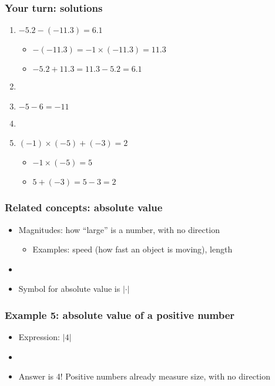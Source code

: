\documentclass[12pt]{beamer}
\newcommand{\myframe}[1]{\begin{frame} \frametitle{#1}}
\begin{document}
\myframe{Your turn: solutions}
\begin{enumerate}
\item $-5.2 - (-11.3) = 6.1$
\begin{itemize}
\item $-(-11.3) = -1 \times (-11.3) = 11.3$
\item $-5.2 + 11.3 = 11.3 - 5.2 = 6.1$
\end{itemize}
\item[]
\item $-5 - 6 = -11$
\item[]
\item $(-1)\times(-5) + (-3) = 2$
\begin{itemize}
\item $-1 \times (-5) = 5$
\item $5 + (-3) = 5 - 3 = 2$
\end{itemize}
\end{enumerate}
\end{frame}

\myframe{Related concepts: absolute value}
\begin{itemize}
\item Magnitudes: how ``large'' is a number, with no direction
\begin{itemize}
\item Examples: speed (how fast an object is moving), length 
\end{itemize}
\item[]
\item Symbol for absolute value is $|\cdot |$
\end{itemize}
\centering
{}
\end{frame}

\myframe{Example 5: absolute value of a positive number}
\begin{itemize}
\item Expression: $|4|$
\item[]
\item Answer is 4! Positive numbers already measure size, with no direction
\end{itemize}
\end{frame}
\end{document}
